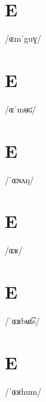 \documentclass[10pt,a4paper,twoside]{book}
\begin{document}
\section*{E}

\begin{multicols}{3}
 {/ɶmˈguɣ/} {}
\end{multicols}

\section*{E}

\begin{multicols}{3}
 {/ɶˈmʉʛ/} {}
\end{multicols}

\section*{E}

\begin{multicols}{3}
 {/ˈɶɴʌŋ/} {}
\end{multicols}

\section*{E}

\begin{multicols}{3}
 {/ɶʁ/} {}
\end{multicols}

\section*{E}

\begin{multicols}{3}
 {/ˈɶʁbʉt͡s/} {}
\end{multicols}

\section*{E}

\begin{multicols}{3}
 {/ˈɶʁhum/} {}
\end{multicols}
\end{document}
